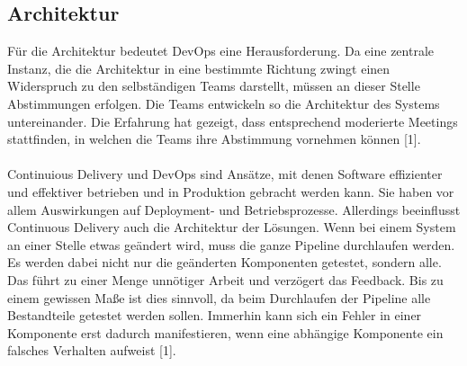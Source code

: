 \subsection{Architektur}
Für die Architektur bedeutet DevOps eine Herausforderung. Da eine zentrale Instanz, die die Architektur in eine bestimmte Richtung zwingt einen Widerspruch zu den selbständigen Teams darstellt, müssen an dieser Stelle Abstimmungen erfolgen. Die Teams entwickeln so die Architektur des Systems untereinander. Die Erfahrung hat gezeigt, dass entsprechend moderierte Meetings stattfinden, in welchen die Teams ihre Abstimmung vornehmen können [1].\\ \\
Continuious Delivery und DevOps sind Ansätze, mit denen Software effizienter und effektiver betrieben und in Produktion gebracht werden kann. Sie haben vor allem Auswirkungen auf Deployment- und Betriebsprozesse. Allerdings beeinflusst Continuous Delivery auch die Architektur der Lösungen. Wenn bei einem System an einer Stelle etwas geändert wird, muss die ganze Pipeline durchlaufen werden. Es werden dabei nicht nur die geänderten Komponenten getestet, sondern alle. Das führt zu einer Menge unnötiger Arbeit und verzögert das Feedback. Bis zu einem gewissen Maße ist dies sinnvoll, da beim Durchlaufen der Pipeline alle Bestandteile getestet werden sollen. Immerhin kann sich ein Fehler in einer Komponente erst dadurch manifestieren, wenn eine abhängige Komponente ein falsches Verhalten aufweist [1].\\ \\
